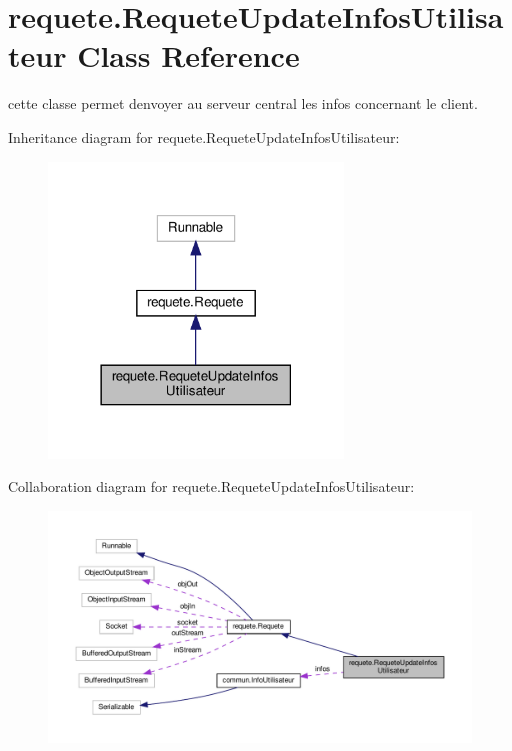 \hypertarget{classrequete_1_1RequeteUpdateInfosUtilisateur}{}\section{requete.\+Requete\+Update\+Infos\+Utilisateur Class Reference}
\label{classrequete_1_1RequeteUpdateInfosUtilisateur}


cette classe permet d\textquotesingle{}envoyer au serveur central les infos concernant le client.  




Inheritance diagram for requete.\+Requete\+Update\+Infos\+Utilisateur\+:\nopagebreak
\begin{figure}[H]
\begin{center}
\leavevmode
\includegraphics[width=222pt]{classrequete_1_1RequeteUpdateInfosUtilisateur__inherit__graph}
\end{center}
\end{figure}


Collaboration diagram for requete.\+Requete\+Update\+Infos\+Utilisateur\+:\nopagebreak
\begin{figure}[H]
\begin{center}
\leavevmode
\includegraphics[width=350pt]{classrequete_1_1RequeteUpdateInfosUtilisateur__coll__graph}
\end{center}
\end{figure}
